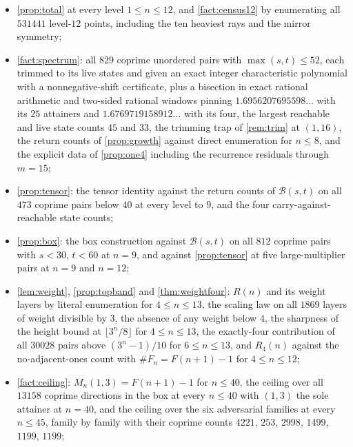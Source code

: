 \documentclass[11pt]{amsart}
\theoremstyle{definition}
\theoremstyle{remark}
\begin{document}
\begin{itemize}
\item \cref{prop:total} at every level $1\le n\le 12$, and \cref{fact:census12} by enumerating all $531441$ level-$12$ points, including the ten heaviest rays and the mirror symmetry;
\item \cref{fact:spectrum}: all $829$ coprime unordered pairs with $\max(s,t)\le 52$, each trimmed to its live states and given an exact integer characteristic polynomial with a nonnegative-shift certificate, plus a bisection in exact rational arithmetic and two-sided rational windows pinning $1.6956207695598\ldots$ with its $25$ attainers and $1.6769719158912\ldots$ with its four, the largest reachable and live state counts $45$ and $33$, the trimming trap of \cref{rem:trim} at $(1,16)$, the return counts of \cref{prop:growth} against direct enumeration for $n\le 8$, and the explicit data of \cref{prop:one4} including the recurrence residuals through $m=15$;
\item \cref{prop:tensor}: the tensor identity against the return counts of $\mathcal{B}(s,t)$ on all $473$ coprime pairs below $40$ at every level to $9$, and the four carry-against-reachable state counts;
\item \cref{prop:box}: the box construction against $\mathcal{B}(s,t)$ on all $812$ coprime pairs with $s<30$, $t<60$ at $n=9$, and against \cref{prop:tensor} at five large-multiplier pairs at $n=9$ and $n=12$;
\item \cref{lem:weight}, \cref{prop:topband} and \cref{thm:weightfour}: $R(n)$ and its weight layers by literal enumeration for $4\le n\le 13$, the scaling law on all $1869$ layers of weight divisible by $3$, the absence of any weight below $4$, the sharpness of the height bound at $\lfloor 3^n/8\rfloor$ for $4\le n\le 13$, the exactly-four contribution of all $30028$ pairs above $(3^n-1)/10$ for $6\le n\le 13$, and $R_4(n)$ against the no-adjacent-ones count with $\#F_n=F(n+1)-1$ for $4\le n\le 12$;
\item \cref{fact:ceiling}: $M_n(1,3)=F(n+1)-1$ for $n\le 40$, the ceiling over all $13158$ coprime directions in the box at every $n\le 40$ with $(1,3)$ the sole attainer at $n=40$, and the ceiling over the six adversarial families at every $n\le 45$, family by family with their coprime counts $4221$, $253$, $2998$, $1499$, $1199$, $1199$;

\end{itemize}
\end{document}
